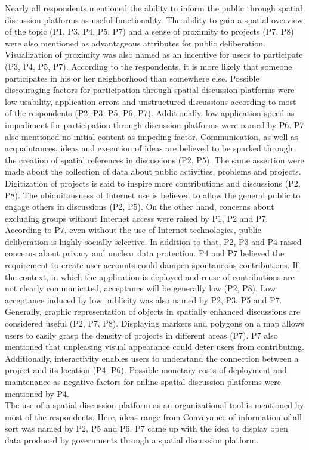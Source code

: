Nearly all respondents mentioned the ability to inform the public through spatial discussion platforms as useful functionality. The ability to gain a spatial overview of the topic (P1, P3, P4, P5, P7) and a sense of proximity to projects (P7, P8) were also mentioned as advantageous attributes for public deliberation. Visualization of proximity was also named as an incentive for users to participate (P3, P4, P5, P7). According to the respondents, it is more likely that someone participates in his or her neighborhood than somewhere else. Possible discouraging factors for participation through spatial discussion platforms were low usability, application errors and unstructured discussions according to most of the respondents (P2, P3, P5, P6, P7). Additionally, low application speed as impediment for participation through discussion platforms were named by P6. P7 also mentioned no initial content as impeding factor. Communication, as well as acquaintances, ideas and execution of ideas are believed to be sparked through the creation of spatial references in discussions (P2, P5). The same assertion were made about the collection of data about public activities, problems and projects. Digitization of projects is said to inspire more contributions and discussions (P2, P8). The ubiquitousness of Internet use is believed to allow the general public to engage others in discussions (P2, P5). On the other hand, concerns about excluding groups without Internet access were raised by P1, P2 and P7. According to P7, even without the use of Internet technologies, public deliberation is highly socially selective. In addition to that, P2, P3 and P4 raised concerns about privacy and unclear data protection. P4 and P7 believed the requirement to create user accounts could dampen spontaneous contributions. If the context, in which the application is deployed and reuse of contributions are not clearly communicated, acceptance will be generally low (P2, P8). Low acceptance induced by low publicity was also named by P2, P3, P5 and P7. Generally, graphic representation of objects in spatially enhanced discussions are considered useful (P2, P7, P8). Displaying markers and polygons on a map allows users to easily grasp the density of projects in different areas (P7). P7 also mentioned that unpleasing visual appearance could deter users from contributing. Additionally, interactivity enables users to understand the connection between a project and its location (P4, P6). Possible monetary costs of deployment and maintenance as negative factors for online spatial discussion platforms were mentioned by P4.\\
The use of a spatial discussion platform as an organizational tool is mentioned by most of the respondents. Here, ideas range from  Conveyance of information of all sort was named by P2, P5 and P6. P7 came up with the idea to display open data produced by governments through a spatial discussion platform.

